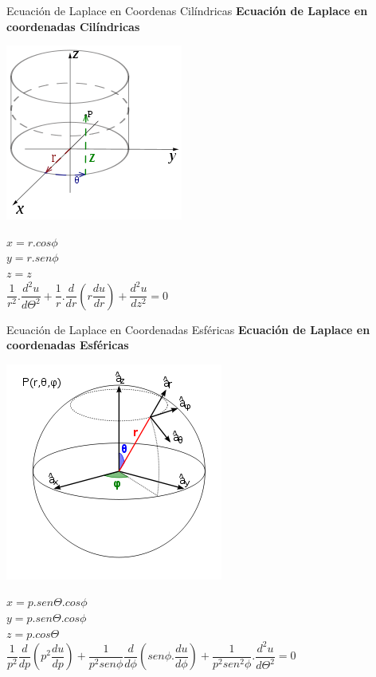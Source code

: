 \documentclass[11pt]{beamer}
\begin{document}
\begin{frame}{Ecuación de Laplace en Coordenas Cilíndricas}
\textbf{Ecuación de Laplace en coordenadas Cilíndricas}\\
\begin{center}
\includegraphics[scale=0.4]{esf.png} 
\end{center}
\begin{center}
$x=r.cos\phi$\\ 
$y=r.sen\phi$\\
$z=z$\\
$\dfrac{1}{r^{2}}.\dfrac{d^{2}u}{d\Theta^{2}}+\dfrac{1}{r}.\dfrac{d}{dr}(r\dfrac{du}{dr})+\dfrac{d^{2}u}{dz^{2}}=0$
\end{center}

\end{frame}

\begin{frame}{Ecuación de Laplace en Coordenadas Esféricas}
\textbf{Ecuación de Laplace en coordenadas Esféricas}
\begin{center}
\includegraphics[scale=0.4]{cil.png} 
\end{center}
\begin{center}
$x=p.sen\Theta.cos\phi$\\
$y=p.sen\Theta.cos\phi$\\
$z=p.cos\Theta$\\
$\dfrac{1}{p^{2}}\dfrac{d}{dp}(p^{2}\dfrac{du}{dp})+\dfrac{1}{p^{2}sen\phi}\dfrac{d}{d\phi}(sen\phi.\dfrac{du}{d\phi})+\dfrac{1}{p^{2}sen^{2}\phi}.\dfrac{d^{2}u}{d\Theta^{2}}=0$\\
\end{center}

\end{frame}
\end{document}

